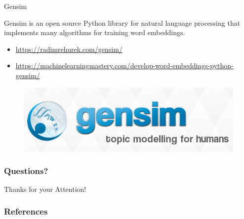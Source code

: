\documentclass[handout]{beamer}
\begin{document}
\begin{frame}{Gensim}
\begin{scriptsize}
Gensim is an open source Python library for natural language processing that implements many algorithms for training word embeddings.


\begin{itemize}
 \item \url{https://radimrehurek.com/gensim/}

  \item \url{https://machinelearningmastery.com/develop-word-embeddings-python-gensim/}
 
\end{itemize}



  \begin{figure}[h]
        	\includegraphics[scale = 0.3]{pics/gensim.png}
        \end{figure}



\end{scriptsize}
\end{frame}







\begin{frame}
\frametitle{Questions?}
\begin{center}\LARGE Thanks for your Attention!\\ \end{center}



\end{frame}

\begin{frame}[allowframebreaks]\scriptsize
\frametitle{References}


%
\end{frame}  


\end{document}
